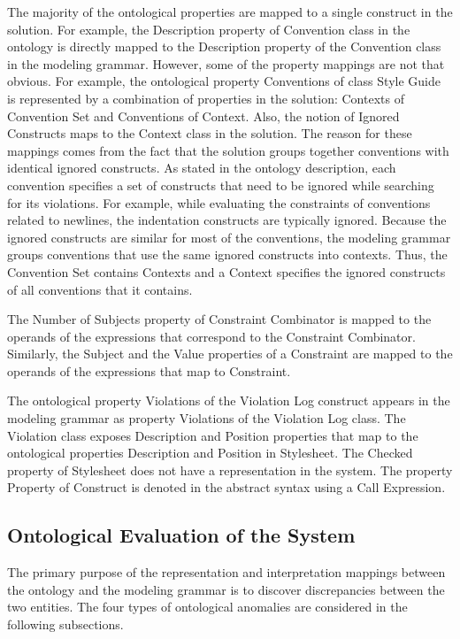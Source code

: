 The majority of the ontological properties are mapped to a single construct in the solution. For
example, the Description property of Convention class in the ontology is directly mapped to the
Description property of the Convention class in the modeling grammar. However, some of the property
mappings are not that obvious. For example, the ontological property Conventions of class Style
Guide is represented by a combination of properties in the solution: Contexts of Convention Set and
Conventions of Context. Also, the notion of Ignored Constructs maps to the Context class in the
solution. The reason for these mappings comes from the fact that the solution groups together
conventions with identical ignored constructs. As stated in the ontology description, each
convention specifies a set of constructs that need to be ignored while searching for its violations.
For example, while evaluating the constraints of conventions related to newlines, the indentation
constructs are typically ignored. Because the ignored constructs are similar for most of the
conventions, the modeling grammar groups conventions that use the same ignored constructs into
contexts. Thus, the Convention Set contains Contexts and a Context specifies the ignored constructs
of all conventions that it contains.

The Number of Subjects property of Constraint Combinator is mapped to the operands of the
expressions that correspond to the Constraint Combinator. Similarly, the Subject and the Value
properties of a Constraint are mapped to the operands of the expressions that map to Constraint.

The ontological property Violations of the Violation Log construct appears in the modeling grammar
as property Violations of the Violation Log class. The Violation class exposes Description and
Position properties that map to the ontological properties Description and Position in Stylesheet.
The Checked property of Stylesheet does not have a representation in the system. The property
Property of Construct is denoted in the abstract syntax using a Call Expression.

\subsection{Ontological Evaluation of the System}

The primary purpose of the representation and interpretation mappings between
the ontology and the modeling grammar is to discover discrepancies between the
two entities. The four types of ontological anomalies are considered in the
following subsections.

